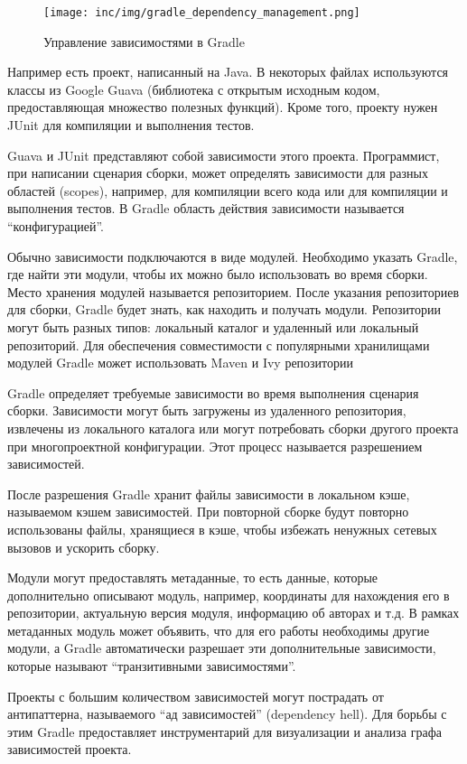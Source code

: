 \begin{figure}[ht]
  \centering
  \texttt{[image: inc/img/gradle\_dependency\_management.png]}
  \caption{Управление зависимостями в Gradle}
  \label{fig:gradleDeps}
\end{figure}

Например есть проект, написанный на Java.
В некоторых файлах используются классы из Google Guava (библиотека с открытым исходным кодом, предоставляющая множество полезных функций).
Кроме того, проекту нужен JUnit для компиляции и выполнения тестов.

Guava и JUnit представляют собой зависимости этого проекта.
Программист, при написании сценария сборки, может определять зависимости для разных областей (scopes), например, для компиляции всего кода или для компиляции и выполнения тестов.
В Gradle область действия зависимости называется ``конфигурацией''.

Обычно зависимости подключаются в виде модулей.
Необходимо указать Gradle, где найти эти модули, чтобы их можно было использовать во время сборки.
Место хранения модулей называется репозиторием.
После указания репозиториев для сборки, Gradle будет знать, как находить и получать модули.
Репозитории могут быть разных типов: локальный каталог и удаленный или локальный репозиторий.
Для обеспечения совместимости с популярными хранилищами модулей Gradle может использовать Maven и Ivy репозитории

Gradle определяет требуемые зависимости во время выполнения сценария сборки.
Зависимости могут быть загружены из удаленного репозитория, извлечены из локального каталога или могут потребовать сборки другого проекта при многопроектной конфигурации.
Этот процесс называется разрешением зависимостей.

После разрешения Gradle хранит файлы зависимости в локальном кэше, называемом кэшем зависимостей.
При повторной сборке будут повторно использованы файлы, хранящиеся в кэше, чтобы избежать ненужных сетевых вызовов и ускорить сборку.

Модули могут предоставлять метаданные, то есть данные, которые дополнительно описывают модуль, например, координаты для нахождения его в репозитории, актуальную версия модуля, информацию об авторах и т.д.
В рамках метаданных модуль может объявить, что для его работы необходимы другие модули, а Gradle автоматически разрешает эти дополнительные зависимости, которые называют ``транзитивными зависимостями''.

Проекты с большим количеством зависимостей могут пострадать от антипаттерна, называемого ``ад зависимостей'' (dependency hell).
Для борьбы с этим Gradle предоставляет инструментарий для визуализации и анализа графа зависимостей проекта.

